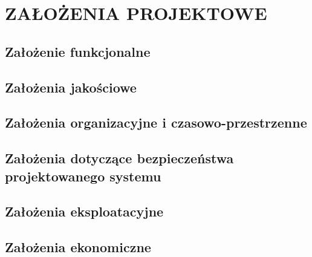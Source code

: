 \section{ZAŁOŻENIA PROJEKTOWE}

\subsection{Założenie funkcjonalne}

\subsection{Założenia jakościowe}

\subsection{Założenia organizacyjne i czasowo-przestrzenne}

\subsection{Założenia dotyczące bezpieczeństwa projektowanego systemu}

\subsection{Założenia eksploatacyjne}

\subsection{Założenia ekonomiczne}

\newpage

